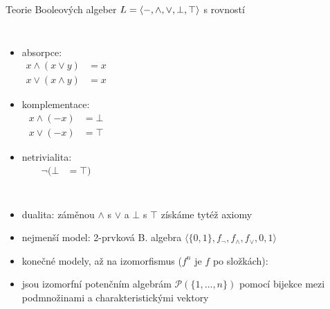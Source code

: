 \documentclass{beamer}
\begin{document}
\begin{frame}{Teorie Booleových algeber \hfill $L=\langle -,{\land},{\lor},\bot,\top\rangle$ s rovností}
{\begin{columns}
        \begin{itemize}
            \item \alert{absorpce}:
            \vspace{-9pt}\begin{align*}
                x\land(x\lor y) &= x\\
                x\lor(x\land y) &= x
            \end{align*}\vspace{-24pt}
            \item \alert{komplementace}:
            \vspace{-9pt}\begin{align*}
                x\land(-x) &= \bot \\
                x\lor(-x) &= \top
            \end{align*}\vspace{-24pt}
            \item \alert{netrivialita}:
            \vspace{-9pt}\begin{align*}
                \neg (\bot &= \top)
            \end{align*}
        \end{itemize}
                

    \end{columns}
    \vspace{9pt}
    }

    \begin{itemize}
        \item dualita: záměnou $\land$ s $\lor$ a $\bot$ s $\top$ získáme tytéž axiomy    
        \item nejmenší model: \alert{2-prvková B. algebra} $\langle \{0,1\},f_\neg,f_\land,f_\lor,0,1\rangle$
        \item konečné modely, až na \alert{izomorfismus} ($f^n$ je $f$ po složkách):
        
        \item jsou izomorfní \alert{potenčním algebrám} $\mathcal P(\{1,\dots,n\})$ pomocí bijekce mezi podmnožinami a  charakteristickými vektory
    \end{itemize}
    
\end{frame}
\end{document}
